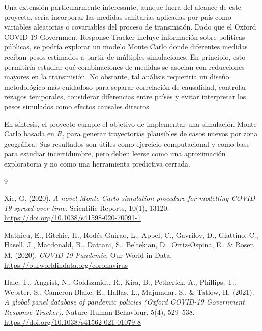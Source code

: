 \documentclass[12pt]{article}
\begin{document}
Una extensión particularmente interesante, aunque fuera del alcance de este
proyecto, sería incorporar las medidas sanitarias aplicadas por país como
variables aleatorias o covariables del proceso de transmisión. Dado que el
Oxford COVID-19 Government Response Tracker incluye información sobre políticas
públicas, se podría explorar un modelo Monte Carlo donde diferentes medidas
reciban pesos estimados a partir de múltiples simulaciones. En principio, esto
permitiría estudiar qué combinaciones de medidas se asocian con reducciones
mayores en la transmisión. No obstante, tal análisis requeriría un diseño
metodológico más cuidadoso para separar correlación de causalidad, controlar
rezagos temporales, considerar diferencias entre países y evitar interpretar
los pesos simulados como efectos causales directos.

En síntesis, el proyecto cumple el objetivo de implementar una simulación
Monte Carlo basada en \(R_t\) para generar trayectorias plausibles de casos
nuevos por zona geográfica. Sus resultados son útiles como ejercicio
computacional y como base para estudiar incertidumbre, pero deben leerse como
una aproximación exploratoria y no como una herramienta predictiva cerrada.

\newpage

\begin{thebibliography}{9}

Xie, G. (2020).
\textit{A novel Monte Carlo simulation procedure for modelling COVID-19 spread over time}.
Scientific Reports, 10(1), 13120.
\url{https://doi.org/10.1038/s41598-020-70091-1}

Mathieu, E., Ritchie, H., Rodés-Guirao, L., Appel, C., Gavrilov, D.,
Giattino, C., Hasell, J., Macdonald, B., Dattani, S., Beltekian, D.,
Ortiz-Ospina, E., \& Roser, M. (2020).
\textit{COVID-19 Pandemic}.
Our World in Data.
\url{https://ourworldindata.org/coronavirus}

Hale, T., Angrist, N., Goldszmidt, R., Kira, B., Petherick, A., Phillips, T.,
Webster, S., Cameron-Blake, E., Hallas, L., Majumdar, S., \& Tatlow, H. (2021).
\textit{A global panel database of pandemic policies (Oxford COVID-19 Government Response Tracker)}.
Nature Human Behaviour, 5(4), 529--538.
\url{https://doi.org/10.1038/s41562-021-01079-8}

\end{thebibliography}
\end{document}
